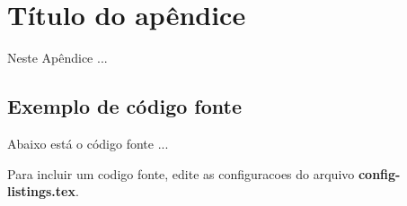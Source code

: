 
\chapter{Título do apêndice}
\label{chap:apendice-chap-1}

Neste Apêndice ...


\section{Exemplo de código fonte}
\label{chap:codigo-fonte}

Abaixo está o código fonte ...

Para incluir um codigo fonte, edite as configuracoes do arquivo \textbf{config-listings.tex}.


